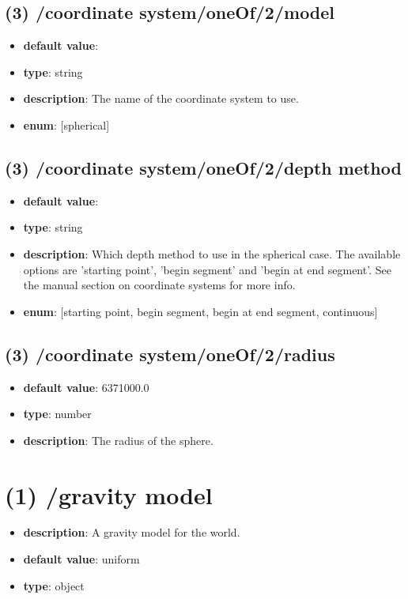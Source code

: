 \subsection{(3) /coordinate system/oneOf/2/model}
\begin{itemize}[leftmargin=3em]\item {\bf default value}: 
\item {\bf type}: string
\item {\bf description}: The name of the coordinate system to use.
\item {\bf enum}: [spherical]\end{itemize}\subsection{(3) /coordinate system/oneOf/2/depth method}
\begin{itemize}[leftmargin=3em]\item {\bf default value}: 
\item {\bf type}: string
\item {\bf description}: Which depth method to use in the spherical case. The available options are 'starting point', 'begin segment' and 'begin at end segment'. See the manual section on coordinate systems for more info.
\item {\bf enum}: [starting point, begin segment, begin at end segment, continuous]\end{itemize}\subsection{(3) /coordinate system/oneOf/2/radius}
\begin{itemize}[leftmargin=3em]\item {\bf default value}: 6371000.0
\item {\bf type}: number
\item {\bf description}: The radius of the sphere.
\end{itemize}\section{(1) /gravity model}
\begin{itemize}[leftmargin=1em]\item {\bf description}: A gravity model for the world.
\item {\bf default value}: uniform
\item {\bf type}: object
\end{itemize}

